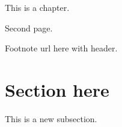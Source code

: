 
This is a chapter.

\newpage

Second page.

Footnote url here with header.

\KittelEquationExpandedX

\section{Section here}
\label{sec:section-here}

This is a new subsection.

\clearpage
